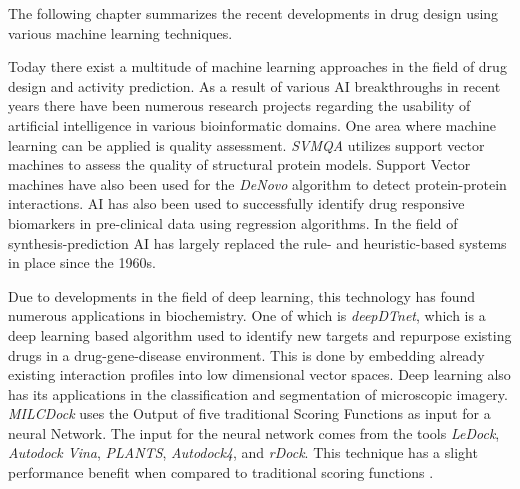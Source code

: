 The following chapter summarizes the recent developments in drug design using various machine 
learning techniques. 

Today there exist a multitude of machine learning approaches in the field of drug design and activity prediction.
As a result of various AI breakthroughs in recent years there have been numerous research projects regarding the usability of artificial intelligence
in various bioinformatic domains.
One area where machine learning can be applied is quality assessment.
\textit{SVMQA} utilizes support vector machines to assess the quality of structural protein models\cite{Manavalan2017}.
Support Vector machines have also been used for the \textit{DeNovo} algorithm to detect protein-protein interactions\cite{Eid2016}.
AI has also been used to successfully identify drug responsive biomarkers in pre-clinical data using regression algorithms\cite{Li2015}.
In the field of synthesis-prediction AI has largely replaced the rule- and heuristic-based systems in place since the 1960s\cite{Johansson2019}.

Due to developments in the field of deep learning, this technology has found numerous applications in biochemistry\cite{Chen2018}.
One of which is \textit{deepDTnet}, which is a deep learning based algorithm used to identify new targets and repurpose existing drugs in a drug-gene-disease environment.
This is done by embedding already existing interaction profiles into low dimensional vector spaces\cite{Zeng}.
Deep learning also has its applications in the classification and segmentation of microscopic imagery\cite{Kraus2016}.
\textit{MILCDock} uses the Output of five traditional Scoring Functions as input for a neural Network. 
The input for the neural network comes from the tools \textit{LeDock}, \textit{Autodock Vina}, \textit{PLANTS},  \textit{Autodock4}, and \textit{rDock}. 
This technique has a slight performance benefit when compared to traditional scoring functions \cite[]{Morris2022}.
